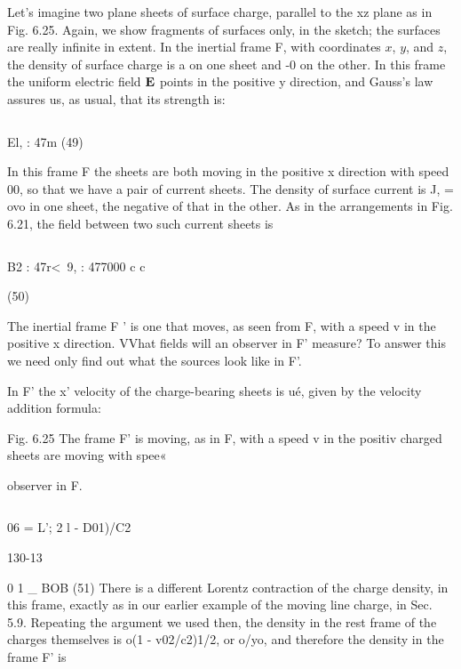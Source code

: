 Let's imagine two plane sheets of surface charge, parallel to the
xz plane as in Fig. 6.25. Again, we show fragments of surfaces only,
in the sketch; the surfaces are really infinite in extent. In the inertial
frame F, with coordinates $x$, $y$, and $z$, the density of surface charge
is a on one sheet and -0 on the other. In this frame the uniform
electric field $\mathbf{E}$ points in the positive y direction, and Gauss's law
assures us, as usual, that its strength is:

\begin{equation}
\end{equation}

El, : 47m (49)

In this frame F the sheets are both moving in the positive x direction
with speed 00, so that we have a pair of current sheets. The
density of surface current is J, = ovo in one sheet, the negative of
that in the other. As in the arrangements in Fig. 6.21, the field between
two such current sheets is

\begin{equation}
\end{equation}

B2 : 47r<~9, : 477000
c c

(50)

The inertial frame F ' is one that moves, as seen from F, with a speed
v in the positive x direction. VVhat fields will an observer in F'
measure? To answer this we need only find out what the sources look
like in F'.

In F' the x' velocity of the charge-bearing sheets is ué, given by
the velocity addition formula:

 

Fig. 6.25 The frame F' is moving, as
in F, with a speed v in the positiv
charged sheets are moving with spee«

observer in F.

\begin{equation}
\end{equation}

06 = L'; 2
l - D01)/C2

130-13

0 1 _ BOB (51)
There is a different Lorentz contraction of the charge density, in this
frame, exactly as in our earlier example of the moving line charge,
in Sec. 5.9. Repeating the argument we used then, the density in
the rest frame of the charges themselves is o(1 - v02/c2)1/2, or o/yo,
and therefore the density in the frame F' is

